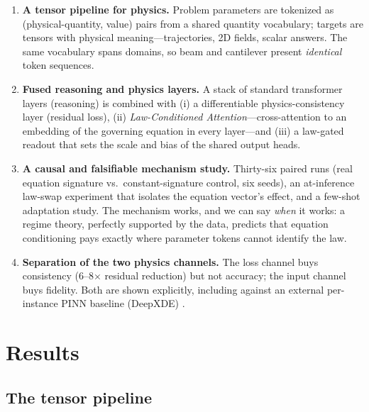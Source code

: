 \documentclass[11pt,a4paper]{article}
\begin{document}
\begin{enumerate}[leftmargin=1.6em,itemsep=0.2em]
  \item \textbf{A tensor pipeline for physics.} Problem parameters are
  tokenized as (physical-quantity, value) pairs from a shared quantity
  vocabulary; targets are tensors with physical meaning---trajectories, 2D
  fields, scalar answers. The same vocabulary spans domains, so beam and
  cantilever present \emph{identical} token sequences.
  \item \textbf{Fused reasoning and physics layers.} A stack of standard
  transformer layers (reasoning) is combined with (i) a differentiable
  physics-consistency layer (residual loss), (ii) \emph{Law-Conditioned
  Attention}---cross-attention to an embedding of the governing equation in
  every layer---and (iii) a law-gated readout that sets the scale and bias of
  the shared output heads.
  \item \textbf{A causal and falsifiable mechanism study.} Thirty-six paired
  runs (real equation signature vs.\ constant-signature control, six seeds),
  an at-inference law-swap experiment that isolates the equation vector's
  effect, and a few-shot adaptation study. The mechanism works, and we can
  say \emph{when} it works: a regime theory, perfectly supported by the data,
  predicts that equation conditioning pays exactly where parameter tokens
  cannot identify the law.
  \item \textbf{Separation of the two physics channels.} The loss channel
  buys consistency (6--8$\times$ residual reduction) but not accuracy; the
  input channel buys fidelity. Both are shown explicitly, including against
  an external per-instance PINN baseline (DeepXDE) \cite{lu2021deepxde}.
\end{enumerate}

\section{Results}
\label{sec:results}

\subsection{The tensor pipeline}
\label{sec:pipeline}
\end{document}
